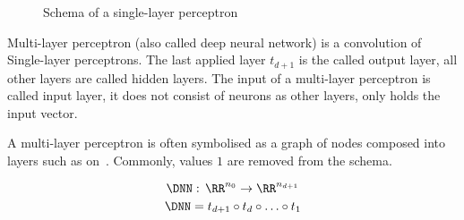 \begin{figure}[h]
    \begin{center}
        \caption{Schema of a single-layer perceptron}\label{fig:slp_schema}
    \end{center}
\end{figure}

\begin{definition}
Multi-layer perceptron (also called deep neural network)
is a convolution of Single-layer perceptrons.
The last applied layer $t_{d+1}$ is the called output layer,
all other layers are called hidden
layers. The input of a multi-layer perceptron is called input layer,
it does not consist of neurons as other layers, only holds the input vector.

A multi-layer perceptron is often symbolised as a graph of nodes composed
into layers such as on~. Commonly, values $1$
are removed from the schema.

\begin{equation*}
    \DNN: \, \RR^{n_0} \to \RR^{n_{d+1}}
\end{equation*}
\begin{equation*}
    \DNN = t_{d+1} \circ t_d \circ \ldots \circ t_1
\end{equation*}
\end{definition}

